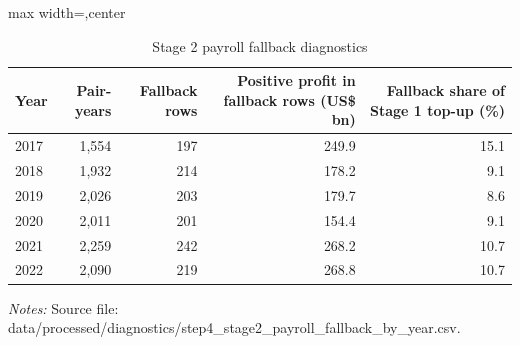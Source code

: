 \begin{table}[H]
\centering
\scriptsize
\caption{Stage 2 payroll fallback diagnostics}
\label{tab:app_stage2_payroll_fallback}
\begin{adjustbox}{max width=\textwidth,center}
\begin{tabular}{@{}lrrrr@{}}
\toprule
Year & Pair-years & Fallback rows & Positive profit in fallback rows (US\$ bn) & Fallback share of Stage 1 top-up (\%) \\
\midrule
2017 & 1,554 & 197 & 249.9 & 15.1 \\
2018 & 1,932 & 214 & 178.2 &  9.1 \\
2019 & 2,026 & 203 & 179.7 &  8.6 \\
2020 & 2,011 & 201 & 154.4 &  9.1 \\
2021 & 2,259 & 242 & 268.2 & 10.7 \\
2022 & 2,090 & 219 & 268.8 & 10.7 \\
\bottomrule
\end{tabular}
\end{adjustbox}

\vspace{0.5em}
\begin{minipage}{0.96\textwidth}
\footnotesize\raggedright \textit{Notes:} Source file: data/processed/diagnostics/step4\_stage2\_payroll\_fallback\_by\_year.csv.
\end{minipage}
\end{table}
